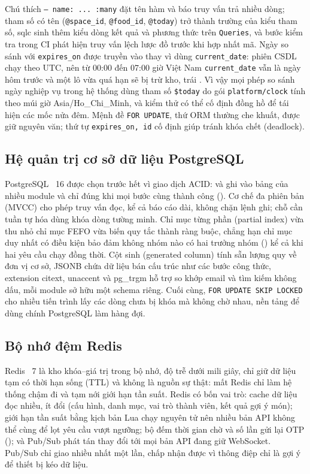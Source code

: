 Chú thích \texttt{-- name: ... :many} đặt tên hàm và báo truy vấn trả nhiều dòng; tham số có tên (\texttt{@space\_id}, \texttt{@food\_id}, \texttt{@today}) trở thành trường của kiểu tham số, sqlc sinh thêm kiểu dòng kết quả và phương thức trên \texttt{Queries}, và bước kiểm tra trong CI phát hiện truy vấn lệch lược đồ trước khi hợp nhất mã. Ngày so sánh với \texttt{expires\_on} được truyền vào thay vì dùng \texttt{current\_date}: phiên CSDL chạy theo UTC, nên từ 00:00 đến 07:00 giờ Việt Nam \texttt{current\_date} vẫn là ngày hôm trước và một lô vừa quá hạn sẽ bị trừ kho, trái . Vì vậy mọi phép so sánh ngày nghiệp vụ trong hệ thống dùng tham số \texttt{\$today} do gói \texttt{platform/clock} tính theo múi giờ Asia/Ho\_Chi\_Minh, và kiểm thử có thể cố định đồng hồ để tái hiện các mốc nửa đêm. Mệnh đề \texttt{FOR UPDATE}, thứ ORM thường che khuất, được giữ nguyên văn; thứ tự \texttt{expires\_on, id} cố định giúp tránh khóa chết (deadlock).

\subsection{Hệ quản trị cơ sở dữ liệu PostgreSQL}\label{ssec:cn-postgresql}

PostgreSQL~\cite{postgresql} 16 được chọn trước hết vì giao dịch ACID:  và  ghi vào bảng của nhiều module và chỉ đúng khi mọi bước cùng thành công (). Cơ chế đa phiên bản (MVCC) cho phép truy vấn đọc, kể cả báo cáo dài, không chặn lệnh ghi; chỗ cần tuần tự hóa dùng khóa dòng tường minh. Chỉ mục từng phần (partial index) vừa thu nhỏ chỉ mục FEFO vừa biến quy tắc thành ràng buộc, chẳng hạn chỉ mục duy nhất có điều kiện bảo đảm không nhóm nào có hai trưởng nhóm () kể cả khi hai yêu cầu chạy đồng thời. Cột sinh (generated column) tính sẵn lượng quy về đơn vị cơ sở, JSONB chứa dữ liệu bán cấu trúc như các bước công thức, extension citext, unaccent và pg\_trgm hỗ trợ so khớp email và tìm kiếm không dấu, mỗi module sở hữu một schema riêng. Cuối cùng, \texttt{FOR UPDATE SKIP LOCKED} cho nhiều tiến trình lấy các dòng chưa bị khóa mà không chờ nhau, nền tảng để dùng chính PostgreSQL làm hàng đợi.

\subsection{Bộ nhớ đệm Redis}\label{ssec:cn-redis}

Redis~\cite{redis} 7 là kho khóa–giá trị trong bộ nhớ, độ trễ dưới mili giây, chỉ giữ dữ liệu tạm có thời hạn sống (TTL) và không là nguồn sự thật: mất Redis chỉ làm hệ thống chậm đi và tạm nới giới hạn tần suất. Redis có bốn vai trò: cache dữ liệu đọc nhiều, ít đổi (cấu hình, danh mục, vai trò thành viên, kết quả gợi ý món); giới hạn tần suất bằng kịch bản Lua chạy nguyên tử nên nhiều bản API không thể cùng để lọt yêu cầu vượt ngưỡng; bộ đếm thời gian chờ và số lần gửi lại OTP (); và Pub/Sub phát tán thay đổi tới mọi bản API đang giữ WebSocket. Pub/Sub chỉ giao nhiều nhất một lần, chấp nhận được vì thông điệp chỉ là gợi ý để thiết bị kéo dữ liệu.


